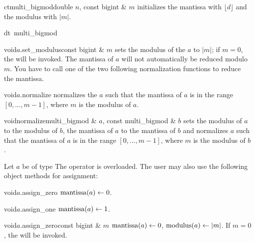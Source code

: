 \begin{fcode}{ct}{multi_bigmod}{double $n$, const bigint & $m$}
  initializes the mantissa with $\lfloor d \rfloor$ and the modulus with $|m|$.
\end{fcode}

\begin{fcode}{dt}{~multi_bigmod}{}
\end{fcode}



\INIT

\begin{fcode}{void}{$a$.set_modulus}{const bigint & $m$}
  sets the modulus of the  $a$ to $|m|$; if $m = 0$, the \LEH will be
  invoked.  The mantissa of $a$ will not automatically be reduced modulo $m$.  You have to call
  one of the two following normalization functions to reduce the mantissa.
\end{fcode}

\begin{fcode}{void}{$a$.normalize}{}
  normalizes the  $a$ such that the mantissa of $a$ is in the range $[0,
  \dots, m-1]$, where $m$ is the modulus of $a$.
\end{fcode}

\begin{fcode}{void}{normalize}{multi_bigmod & $a$, const multi_bigmod & $b$}
  sets the modulus of $a$ to the modulus of $b$, the mantissa of $a$ to the mantissa of $b$ and
  normalizes $a$ such that the mantissa of $a$ is in the range $[0, \dots, m-1]$, where $m$ is
  the modulus of $b$.
\end{fcode}



\ASGN

Let $a$ be of type  The operator \code{=} is overloaded.  The user may also
use the following object methods for assignment:

\begin{fcode}{void}{$a$.assign_zero}{}
  $\operatorname{mantissa}(a) \leftarrow 0$.
\end{fcode}

\begin{fcode}{void}{$a$.assign_one}{}
  $\operatorname{mantissa}(a) \leftarrow 1$.
\end{fcode}

\begin{fcode}{void}{$a$.assign_zero}{const bigint & $m$}
  $\operatorname{mantissa}(a) \leftarrow 0$, $\operatorname{modulus}(a) \leftarrow |m|$.  If $m = 0$, the \LEH will be invoked.
\end{fcode}

